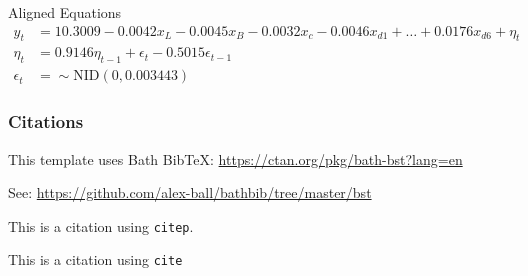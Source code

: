 Aligned Equations
$$
\begin{aligned}
y_t &= 10.3009 -0.0042x_L - 0.0045x_B - 0.0032x_c -0.0046x_{d1} + \ldots + 0.0176x_{d6} + \eta_t \\
\eta_t &= 0.9146\eta_{t-1} + \epsilon_t -0.5015\epsilon_{t-1}\\
\epsilon_t &= \sim \text{NID}(0,0.003443)
\end{aligned}
$$

\subsubsection{Citations}
This template uses Bath BibTeX: \hyperlink{https://ctan.org/pkg/bath-bst?lang=en}{https://ctan.org/pkg/bath-bst?lang=en}

See: \hyperlink{https://github.com/alex-ball/bathbib/tree/master/bst}{https://github.com/alex-ball/bathbib/tree/master/bst}

This is a citation \citep{Elvidge_Baugh_Zhizhin_Hsu_Ghosh_2017} using \texttt{citep}.

This is a citation \cite{Tibshirani_1996} using \texttt{cite}

